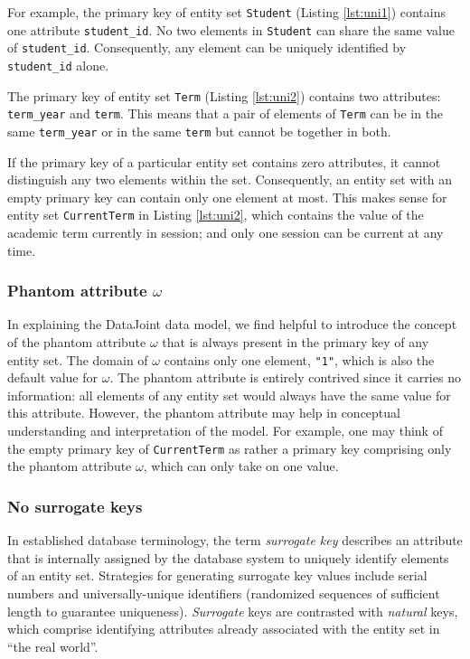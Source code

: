 \documentclass[letter,10pt]{article}
\newcommand{\datajoint}{DataJoint\xspace}
\begin{document}
For example, the primary key of entity set \lstinline$Student$ (Listing \ref{lst:uni1}) contains one attribute \lstinline$student_id$.  
No two elements in \lstinline$Student$ can share the same value of \lstinline$student_id$. 
Consequently, any element can be uniquely identified by \lstinline$student_id$ alone. 

The primary key of entity set \lstinline$Term$ (Listing \ref{lst:uni2}) contains two attributes: \lstinline$term_year$ and \lstinline$term$.
This means that a pair of elements of \lstinline$Term$ can be in the same \lstinline$term_year$ or in the same \lstinline$term$ but cannot be together in both. 

If the primary key of a particular entity set contains zero attributes, it cannot distinguish any two elements within the set.  
Consequently, an entity set with an empty primary key can contain only one element at most.
This makes sense for entity set \lstinline$CurrentTerm$ in Listing \ref{lst:uni2}, which contains the value of the academic term currently in session; and only one session can be current at any time.

\subsubsection{Phantom attribute $\omega$}\label{sec:phantom}
In explaining the \datajoint data model, we find helpful to introduce the concept of the phantom attribute $\omega$ that is always present in the primary key of any entity set.  
The domain of $\omega$ contains only one element, \lstinline$"1"$, which is also the default value for $\omega$.
The phantom attribute is entirely contrived since it carries no information: all elements of any entity set would always have the same value for this attribute.
However, the phantom attribute may help in conceptual understanding and interpretation of the model.
For example, one may think of the empty primary key of \lstinline$CurrentTerm$ as rather a primary key comprising only the phantom attribute $\omega$, which can only take on one value.
 
\subsubsection{No surrogate keys}
In established database terminology, the term \emph{surrogate key} describes an attribute that is internally assigned by the database system to uniquely identify elements of an entity set. 
Strategies for generating surrogate key values include serial numbers and universally-unique identifiers (randomized sequences of sufficient length to guarantee uniqueness).
\emph{Surrogate} keys are contrasted with \emph{natural} keys, which comprise identifying attributes already associated with the entity set in ``the real world''.
\end{document}
